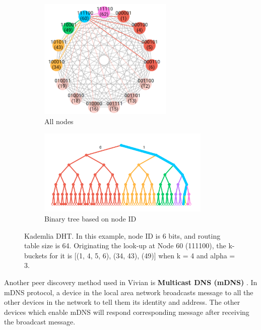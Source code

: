 \begin{figure}[h]
    \centering
    \begin{subfigure}[t]{0.45\textwidth}
        \centering
        \includegraphics[width=0.7\textwidth,trim={0 0 0 0},clip]{figs/kad_k_bucket.png}
        \centering
        \caption{All nodes}
    \end{subfigure}
    \centering
    \begin{subfigure}[b]{0.45\textwidth}
        \centering
        \includegraphics[width=0.9\textwidth,trim={0 0 0 -3.0cm},clip]{figs/kad_binary_tree.png}
        \centering
        \caption{Binary tree based on node ID}
    \end{subfigure}
    \caption{Kademlia DHT. In this example, node ID is 6 bits, and routing table size is 64. Originating the look-up at Node 60 (111100), the k-buckets for it is [(1, 4, 5, 6), (34, 43), (49)] when k = 4 and alpha = 3.}
    \label{fig:kad_dht}
\end{figure}

Another peer discovery method used in Vivian is \textbf{Multicast DNS (mDNS)} \cite{cheshire2013multicast}. In mDNS protocol, a device in the local area network broadcasts message to all the other devices in the network to tell them its identity and address. The other devices which enable mDNS will respond corresponding message after receiving the broadcast message.

